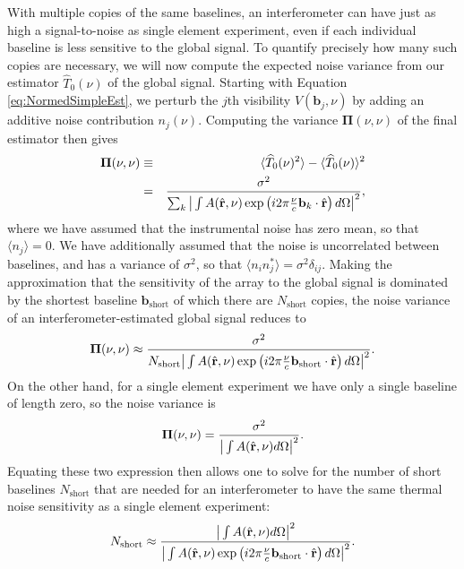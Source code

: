\documentclass[twolcolumn,apj,iop,numberedappendix]{emulateapj}
\newcommand{\rhat}{\hat{\mathbf{r}}}
\begin{document}
With multiple copies of the same baselines, an interferometer can have just as high a signal-to-noise as single element experiment, even if each individual baseline is less sensitive to the global signal. To quantify precisely how many such copies are necessary, we will now compute the expected noise variance from our estimator $\widehat{T}_0 (\nu) $ of the global signal. Starting with Equation \eqref{eq:NormedSimpleEst}, we perturb the $j$th visibility $V(\mathbf{b}_j, \nu)$ by adding an additive noise contribution $n_j (\nu)$. Computing the variance $\boldsymbol \Pi(\nu,\nu)$ of the final estimator then gives
\begin{eqnarray}
\boldsymbol \Pi(\nu,\nu) &\equiv& \langle \widehat{T}_0 (\nu)^2 \rangle - \langle  \widehat{T}_0 (\nu) \rangle^2 \nonumber \\
&=&  \frac{\sigma^2}{ \sum_k \big{|} \int  A(\rhat, \nu) \exp\left(i 2\pi \frac{\nu }{c}\mathbf{b}_k \cdot \rhat \right)d\Omega \big{|}^2},
\end{eqnarray}
where we have assumed that the instrumental noise has zero mean, so that $\langle n_j \rangle = 0$. We have additionally assumed that the noise is uncorrelated between baselines, and has a variance of $\sigma^2$, so that $\langle n_i n_j^* \rangle = \sigma^2 \delta_{ij}$. Making the approximation that the sensitivity of the array to the global signal is dominated by the shortest baseline $\mathbf{b}_\textrm{short}$ of which there are $N_\textrm{short}$ copies, the noise variance of an interferometer-estimated global signal reduces to
\begin{equation}
\boldsymbol \Pi(\nu,\nu) \approx \frac{\sigma^2}{ N_\textrm{short} \big{|} \int  A(\rhat, \nu) \exp\left(i 2\pi \frac{\nu }{c}\mathbf{b}_\textrm{short} \cdot \rhat \right)d\Omega \big{|}^2}.
\end{equation}
On the other hand, for a single element experiment we have only a single baseline of length zero, so the noise variance is
\begin{equation}
\boldsymbol \Pi(\nu,\nu) = \frac{\sigma^2}{\big{|} \int  A(\rhat, \nu) d\Omega \big{|}^2}.
\end{equation}
Equating these two expression then allows one to solve for the number of short baselines $N_\textrm{short}$ that are needed for an interferometer to have the same thermal noise sensitivity as a single element experiment:
\begin{equation}
N_\textrm{short} \approx  \frac{\big{|} \int  A(\rhat, \nu) d\Omega \big{|}^2}{  \big{|} \int  A(\rhat, \nu) \exp\left(i 2\pi \frac{\nu }{c}\mathbf{b}_\textrm{short} \cdot \rhat \right)d\Omega \big{|}^2}.
\end{equation}
\end{document}
